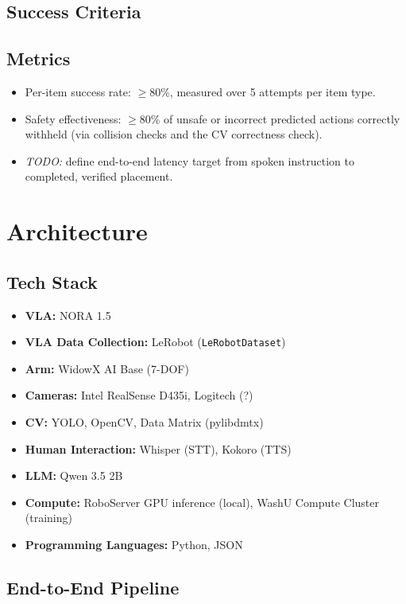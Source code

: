 \documentclass[12pt,a4paper]{article}
\begin{document}
\subsection{Success Criteria}
 
\subsection*{Metrics}
\begin{itemize}
  \item Per-item success rate: $\geq$80\%, measured over 5 attempts per item type.
  \item Safety effectiveness: $\geq$80\% of unsafe or incorrect predicted actions correctly withheld (via collision checks and the CV correctness check).
  \item \textit{TODO:} define end-to-end latency target from spoken instruction to completed, verified placement.
\end{itemize}
\newpage
\section{Architecture}
 
\subsection*{Tech Stack}
\begin{itemize}
  \item \textbf{VLA:} NORA 1.5
  \item \textbf{VLA Data Collection:} LeRobot (\texttt{LeRobotDataset})
  \item \textbf{Arm:} WidowX AI Base (7-DOF)
  \item \textbf{Cameras:} Intel RealSense D435i, Logitech (?)
  \item \textbf{CV:} YOLO, OpenCV, Data Matrix (pylibdmtx)
  \item \textbf{Human Interaction:} Whisper (STT), Kokoro (TTS)
  \item \textbf{LLM:} Qwen 3.5 2B
  \item \textbf{Compute:} RoboServer GPU inference (local), WashU Compute Cluster (training)
  \item \textbf{Programming Languages:} Python, JSON
\end{itemize}
 
\subsection{End-to-End Pipeline}
 
\end{document}
